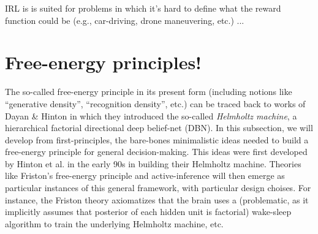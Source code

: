 \documentclass[10pt,letterpaper]{article}
\begin{document}
IRL is is suited for problems in which it's hard to define what the reward function could be
(e.g.,  car-driving, drone maneuvering, etc.) ...

\section{Free-energy principles!}
The so-called free-energy principle in its present form (including notions like ``generative density'', ``recognition density'', etc.) can be traced back to works of Dayan \& Hinton \citep{dayan1995helmholtz} in which they introduced the so-called \textit{Helmholtz machine}, a hierarchical factorial directional deep belief-net (DBN).
In this subsection, we will develop from first-principles, the bare-bones minimalistic ideas needed to build a free-energy principle for general decision-making. This ideas were first developed by Hinton et al. in the early 90s in building their Helmholtz machine. Theories like Friston's free-energy principle and active-inference will then emerge as particular instances of this general framework, with particular design choises. For instance, the Friston theory axiomatizes that the brain uses a (problematic, as it implicitly assumes that posterior of each hidden unit is factorial) wake-sleep algorithm to train the underlying Helmholtz machine, etc.

\end{document}
